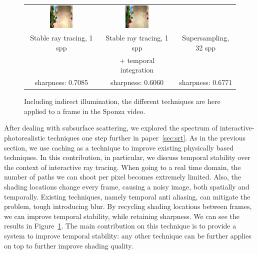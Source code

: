 \begin{figure}
\begin{tabular}{@{}c@{}c@{}@{}c@{}}
	 	 \includegraphics[width=0.33\textwidth]{figures/srt_1_ti_rect_370_300_300_300_frame_211.png} &
	  \includegraphics[width=0.33\textwidth]{figures/ss_32x_rect_370_300_300_300_frame_211.png}
 \\
Stable ray tracing, 1 spp & Stable ray tracing, 1 spp & Supersampling, 32 spp \\
 & + temporal integration &  \\
sharpness: 0.7085 & sharpness: 0.6060 & sharpness: 0.6771 \\[-1.5ex]
\end{tabular}
\caption{Including indirect illumination, the different techniques are here applied to a frame in the Sponza video.}
\label{fig:sponza_video_frame}
\end{figure}

After dealing with subsurface scattering, we explored the spectrum of interactive-photorealistic techniques one step further in paper~\ref{sec:srt}. As in the previous section, we use caching as a technique to improve existing physically based techniques. In this contribution, in particular, we discuss temporal stability over the context of interactive ray tracing. When going to a real time domain, the number of paths we can shoot per pixel becomes extremely limited. Also, the shading locations change every frame, causing a noisy image, both spatially and temporally. Existing techniques, namely temporal anti aliasing, can mitigate the problem, tough introducing blur. By recycling shading locations between frames, we can improve temporal stability, while retaining sharpness. We can see the results in Figure~\ref{fig:sponza_video_frame}. The main contribution on this technique is to provide a system to improve temporal stability: any other technique can be further applies on top to further improve shading quality. 

